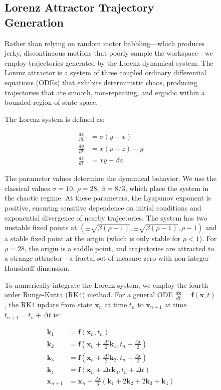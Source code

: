 \documentclass[12pt,a4paper,oneside]{report}
\begin{document}
\begin{figure}[H]
\subsection{Lorenz Attractor Trajectory Generation}

Rather than relying on random motor babbling---which produces jerky, discontinuous motions that poorly sample the workspace---we employ trajectories generated by the Lorenz dynamical system. The Lorenz attractor is a system of three coupled ordinary differential equations (ODEs) that exhibits deterministic chaos, producing trajectories that are smooth, non-repeating, and ergodic within a bounded region of state space.

The Lorenz system is defined as:

\begin{align}
\frac{dx}{dt} &= \sigma(y - x) \\
\frac{dy}{dt} &= x(\rho - z) - y \\
\frac{dz}{dt} &= xy - \beta z
\end{align}

The parameter values determine the dynamical behavior. We use the classical values $\sigma = 10$, $\rho = 28$, $\beta = 8/3$, which place the system in the chaotic regime. At these parameters, the Lyapunov exponent is positive, ensuring sensitive dependence on initial conditions and exponential divergence of nearby trajectories. The system has two unstable fixed points at $(\pm\sqrt{\beta(\rho-1)}, \pm\sqrt{\beta(\rho-1)}, \rho-1)$ and a stable fixed point at the origin (which is only stable for $\rho < 1$). For $\rho = 28$, the origin is a saddle point, and trajectories are attracted to a strange attractor---a fractal set of measure zero with non-integer Hausdorff dimension.

To numerically integrate the Lorenz system, we employ the fourth-order Runge-Kutta (RK4) method. For a general ODE $\frac{d\mathbf{x}}{dt} = \mathbf{f}(\mathbf{x}, t)$, the RK4 update from state $\mathbf{x}_n$ at time $t_n$ to $\mathbf{x}_{n+1}$ at time $t_{n+1} = t_n + \Delta t$ is:

\begin{align}
\mathbf{k}_1 &= \mathbf{f}(\mathbf{x}_n, t_n) \\
\mathbf{k}_2 &= \mathbf{f}(\mathbf{x}_n + \frac{\Delta t}{2}\mathbf{k}_1, t_n + \frac{\Delta t}{2}) \\
\mathbf{k}_3 &= \mathbf{f}(\mathbf{x}_n + \frac{\Delta t}{2}\mathbf{k}_2, t_n + \frac{\Delta t}{2}) \\
\mathbf{k}_4 &= \mathbf{f}(\mathbf{x}_n + \Delta t \mathbf{k}_3, t_n + \Delta t) \\
\mathbf{x}_{n+1} &= \mathbf{x}_n + \frac{\Delta t}{6}(\mathbf{k}_1 + 2\mathbf{k}_2 + 2\mathbf{k}_3 + \mathbf{k}_4)
\end{align}


\end{figure}
\end{document}
